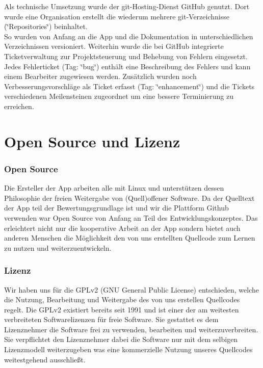 \documentclass[a4paper,ngerman,12pt]{scrreprt}
\begin{document}
Als technische Umsetzung wurde der git-Hosting-Dienst GitHub genutzt. Dort wurde eine Organisation erstellt die wiederum mehrere git-Verzeichnisse (\char`\"{}Repositories\char`\"{}) beinhaltet. \\
So wurden von Anfang an die App und die Dokumentation in unterschiedlichen Verzeichnissen versioniert. Weiterhin wurde die bei GitHub integrierte Ticketverwaltung zur Projektsteuerung und Behebung von Fehlern eingesetzt.\\
Jedes Fehlerticket (Tag: \char`\"{}bug\char`\"{}) enthält eine Beschreibung des Fehlers und kann einem Bearbeiter zugewiesen werden. Zusätzlich wurden noch Verbesserungsvorschläge als Ticket erfasst (Tag: \char`\"{}enhancement\char`\"{}) und die Tickets verschiedenen Meilensteinen zugeordnet um eine bessere Terminierung zu erreichen. 

\chapter{Open Source und Lizenz}
\subsection*{Open Source}
Die Ersteller der App arbeiten alle mit Linux und unterstützen dessen Philosophie der freien Weitergabe von (Quell)offener Software. Da der Quelltext der App teil der Bewertungsgrundlage ist und wir die Plattform Github verwenden war Open Source von Anfang an Teil des Entwicklungskonzeptes. Das erleichtert nicht nur die kooperative Arbeit an der App sondern bietet auch anderen Menschen die Möglichkeit den von uns erstellten Quellcode zum Lernen zu nutzen und weiterzuentwickeln.

\subsection*{Lizenz}

Wir haben uns für die GPLv2 (GNU General Public License) entschieden, welche die Nutzung, Bearbeitung und Weitergabe des von uns erstellen Quellcodes regelt. Die GPLv2 existiert bereits seit 1991 und ist einer der am weitesten verbreiteten Softwarelizenzen für freie Software. Sie gestattet es dem Lizenznehmer die Software frei zu verwenden, bearbeiten und weiterzuverbreiten. Sie verpflichtet den Lizenznehmer dabei die Software nur mit dem selbigen Lizenzmodell weiterzugeben was eine kommerzielle Nutzung unseres Quellcodes weitestgehend ausschließt. 
\end{document}
